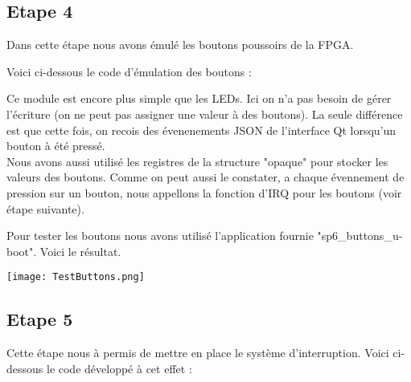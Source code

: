 \pagebreak

\subsection{Etape 4}
Dans cette étape nous avons émulé les boutons poussoirs de la FPGA. 

Voici ci-dessous le code d'émulation des boutons : 


\vspace{0.5cm} 

\vspace{0.5cm} 

Ce module est encore plus simple que les LEDs. Ici on n'a pas besoin de gérer l'écriture (on ne peut pas assigner une valeur à des boutons). La seule différence est que cette fois, on recois des évenenements JSON de l'interface Qt lorsqu'un bouton à été pressé.\\

Nous avons aussi utilisé les registres de la structure "opaque" pour stocker les valeurs des boutons. Comme on peut aussi le constater, a chaque évennement de pression sur un bouton, nous appellons la fonction d'IRQ pour les boutons (voir étape suivante).

Pour tester les boutons nous avons utilisé l'application fournie "sp6\_buttons\_u-boot". Voici le résultat.

\begin{center} 
\hspace{12.45cm}
\texttt{[image: TestButtons.png]}
\end{center}
\vspace{1cm} 

\pagebreak
\subsection{Etape 5}
Cette étape nous à permis de mettre en place le système d'interruption. 
Voici ci-dessous le code développé à cet effet : 


\vspace{0.5cm} 

\vspace{0.5cm} 

